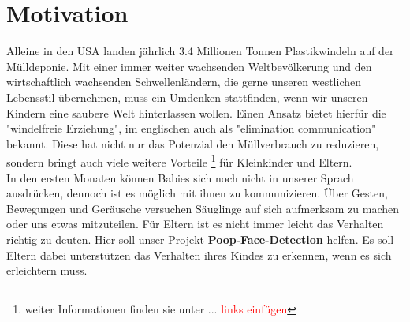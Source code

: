 \section{Motivation}
\label{sec:Motivation}
Alleine in den USA landen jährlich 3.4 Millionen Tonnen Plastikwindeln auf der Mülldeponie. Mit einer immer weiter wachsenden Weltbevölkerung und den wirtschaftlich wachsenden Schwellenländern, die gerne unseren westlichen Lebensstil übernehmen,
muss ein Umdenken stattfinden, wenn wir unseren Kindern eine saubere Welt hinterlassen wollen. Einen Ansatz bietet hierfür die "windelfreie Erziehung", im englischen auch als "elimination communication" bekannt. Diese hat nicht nur das Potenzial den Müllverbrauch zu reduzieren, sondern bringt auch viele weitere Vorteile \footnote{ weiter Informationen finden sie unter ... \textcolor{red}{links einfügen}} für Kleinkinder und Eltern. \\

In den ersten Monaten können Babies sich noch nicht in unserer Sprach ausdrücken, dennoch ist es möglich mit ihnen zu kommunizieren. Über Gesten, Bewegungen und Geräusche versuchen Säuglinge auf sich aufmerksam zu machen oder uns etwas mitzuteilen. Für Eltern ist es nicht immer leicht das Verhalten richtig zu deuten. Hier soll unser Projekt \textbf{Poop-Face-Detection} helfen. Es soll Eltern dabei unterstützen das Verhalten ihres Kindes zu erkennen, wenn es sich erleichtern muss.
